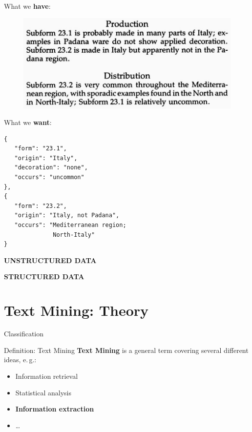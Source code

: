\documentclass[xcolor=x11names, aspectratio=169,usenames,dvipsnames]{beamer}
\begin{document}
\begin{frame}[fragile]{}
\begin{minipage}[t]{0.45\textwidth}
What we \textbf{have}:\medskip

\begin{figure}
\includegraphics[width=1.0\textwidth]{img/consp_ex.jpg}
\end{figure}
\end{minipage}\hfill\pause
\begin{minipage}[t]{0.45\textwidth}
What we \textbf{want}:\medskip
{\scriptsize
\begin{verbatim}
{
   "form": "23.1",
   "origin": "Italy",
   "decoration": "none",
   "occurs": "uncommon"
},
{
   "form": "23.2",
   "origin": "Italy, not Padana",
   "occurs": "Mediterranean region;
              North-Italy"
}
\end{verbatim}
}
\end{minipage}\pause\medskip

\begin{minipage}[t]{0.45\textwidth}
\begin{center}
\alert{\textbf{UNSTRUCTURED DATA}}
\end{center}
\end{minipage}\hfill
\begin{minipage}[t]{0.45\textwidth}
\begin{center}
\alert{\textbf{STRUCTURED DATA}}
\end{center}
\end{minipage}
\end{frame}

\section{Text Mining: Theory}%

\begin{frame}{Classification}
\begin{block}{Definition: Text Mining}\vspace{.5em}
\textbf{Text Mining} is a \alert{general term} covering several different ideas\pause, e.\,g.:
\begin{itemize}[<+->]
\item Information retrieval
\item Statistical analysis
\item \textbf{Information extraction}
\item\dots
\end{itemize}
\end{block}
\end{frame}
\end{document}
